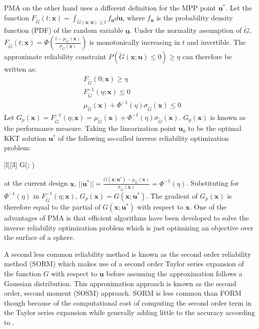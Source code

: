 PMA on the other hand uses a different definition for the MPP point $\bm{u}^*$. Let the function $F_{\tilde{G}}(t; \bm{x}) = \int_{\tilde{G}(\bm{x}; \bm{u}) \leq t} f_{\bm{u}} d\bm{u}$, where $f_{\bm{u}}$ is the probability density function (PDF) of the random variable $\bm{u}$. Under the normality assumption of $\tilde{G}$, $F_{\tilde{G}}(t; \bm{x}) = \Phi(\frac{t - \mu_{\tilde{G}}(\bm{x})}{\sigma_{\tilde{G}}(\bm{x})})$ is monotonically increasing in $t$ and invertible. The approximate reliability constraint $P(\tilde{G}(\bm{x}; \bm{u}) \leq 0) \geq \eta$ can therefore be written as:
\begin{align}
 & F_{\tilde{G}}(0; \bm{x}) \geq \eta \\
 & F_{\tilde{G}}^{-1}(\eta; \bm{x}) \leq 0 \\
 & \mu_{\tilde{G}}(\bm{x}) + \Phi^{-1}(\eta) \sigma_{\tilde{G}}(\bm{x}) \leq 0
\end{align}
Let $G_p(\bm{x}) = F_{\tilde{G}}^{-1}(\eta; \bm{x}) = \mu_{\tilde{G}}(\bm{x}) + \Phi^{-1}(\eta) \sigma_{\tilde{G}}(\bm{x})$. $G_p(\bm{x})$ is known as the performance measure. Taking the linearization point $\bm{u}_0$ to be the optimal KKT solution $\bm{u}^*$ of the following so-called inverse reliability optimization problem:
\begin{mini!}|l|[3]
 {}{G(; )}{}{}
\end{mini!}
at the current design $\bm{x}$, $||\bm{u}^*|| = \frac{G(\bm{x}; \bm{u}^*) - \mu_{\tilde{G}}(\bm{x})}{\sigma_{\tilde{G}}(\bm{x})} = \Phi^{-1}(\eta)$. Substituting for $\Phi^{-1}(\eta)$ in $F_{\tilde{G}}^{-1}(\eta; \bm{x})$, $G_p(\bm{x}) = G(\bm{x}; \bm{u}^*)$. The gradient of $G_p(\bm{x})$ is therefore equal to the partial of $G(\bm{x}; \bm{u}^*)$ with respect to $\bm{x}$. One of the advantages of PMA is that efficient algorithms have been developed to solve the inverse reliability optimization problem which is just optimizing an objective over the surface of a sphere.

A second less common reliability method is known as the second order reliability method (SORM) which makes use of a second order Taylor series expansion of the function $G$ with respect to $\bm{u}$ before assuming the approximation follows a Gaussian distribution. This approximation approach is known as the second order, second moment (SOSM) approach. SORM is less common than FORM though because of the computational cost of computing the second order term in the Taylor series expansion while generally adding little to the accuracy according to \cite{Choi2007}. 

